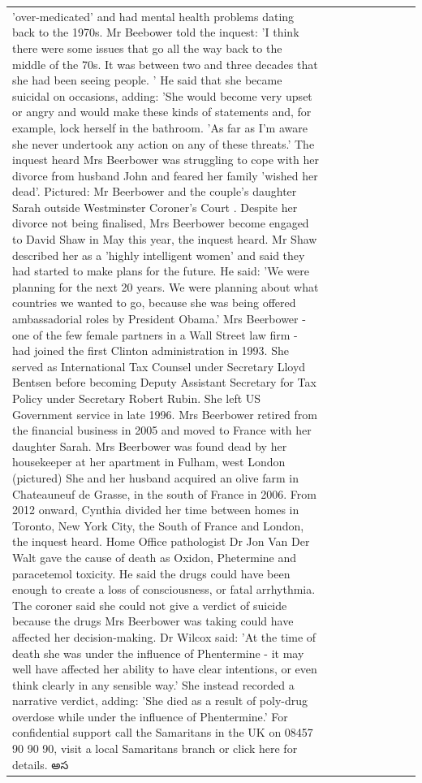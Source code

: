 \begin{table}[H]
\begin{tabular}{lllrlllll}
'over-medicated' and had mental health problems dating back to the 1970s. Mr Beebower told the inquest: 'I think there were some issues that go all the way back to the middle of the 70s. It was between two and three decades that she had been seeing people. ' He said that she became suicidal on occasions, adding: 'She would become very upset or angry and would make these kinds of statements and, for example, lock herself in the bathroom. 'As far as I'm aware she never undertook any action on any of these threats.' The inquest heard Mrs Beerbower was struggling to cope with her divorce from husband John and feared her family 'wished her dead'. Pictured: Mr Beerbower and the couple's daughter Sarah outside Westminster Coroner's Court . Despite her divorce not being finalised, Mrs Beerbower become engaged to David Shaw in May this year, the inquest heard. Mr Shaw described her as a 'highly intelligent women' and said they had started to make plans for the future. He said: 'We were planning for the next 20 years. We were planning about what countries we wanted to go, because she was being offered ambassadorial roles by President Obama.' Mrs Beerbower - one of the few female partners in a Wall Street law firm - had joined the first Clinton administration in 1993. She served as International Tax Counsel under Secretary Lloyd Bentsen before becoming Deputy Assistant Secretary for Tax Policy under Secretary Robert Rubin. She left US Government service in late 1996. Mrs Beerbower retired from the financial business in 2005 and moved to France with her daughter Sarah. Mrs Beerbower was found dead by her housekeeper at her apartment in Fulham, west London (pictured) She and her husband acquired an olive farm in Chateauneuf de Grasse, in the south of France in 2006. From 2012 onward, Cynthia divided her time between homes in Toronto, New York City, the South of France and London, the inquest heard. Home Office pathologist Dr Jon Van Der Walt gave the cause of death as Oxidon, Phetermine and paracetemol toxicity. He said the drugs could have been enough to create a loss of consciousness, or fatal arrhythmia. The coroner said she could not give a verdict of suicide because the drugs Mrs Beerbower was taking could have affected her decision-making. Dr Wilcox said: 'At the time of death she was under the influence of Phentermine - it may well have affected her ability to have clear intentions, or even think clearly in any sensible way.' She instead recorded a narrative verdict, adding: 'She died as a result of poly-drug overdose while under the influence of Phentermine.' For confidential support call the Samaritans in the UK on 08457 90 90 90, visit a local Samaritans branch or click here for details. అస \\

\end{tabular}
\end{table}
